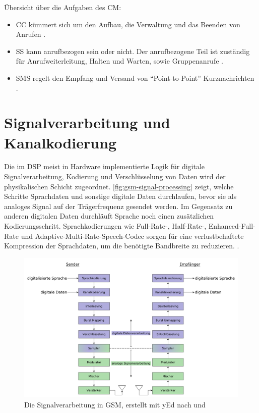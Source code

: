 Übersicht über die Aufgaben des \ac{CM}:
\begin{itemize}
\item \ac{CC} kümmert sich um den Aufbau, die Verwaltung und das Beenden von Anrufen .
\item \ac{SS} kann anrufbezogen sein oder nicht. Der anrufbezogene Teil ist zuständig für Anrufweiterleitung, Halten und Warten, sowie Gruppenanrufe .
\item \begin{sloppypar}\ac{SMS} regelt den Empfang und Versand von "`Point-to-Point"' Kurznachrichten .\end{sloppypar}
\end{itemize}

\section{Signalverarbeitung und Kanalkodierung} \label{hdl:encoding}
Die im \ac{DSP} meist in Hardware implementierte Logik für digitale Signalverarbeitung, Kodierung und Verschlüsselung von Daten wird der physikalischen Schicht zugeordnet. \autoref{fig:gsm-signal-processing} zeigt, welche Schritte Sprachdaten und sonstige digitale Daten durchlaufen, bevor sie als analoges Signal auf der Trägerfrequenz gesendet werden. Im Gegensatz zu anderen digitalen Daten durchläuft Sprache noch einen zusätzlichen Kodierungsschritt. Sprachkodierungen wie Full-Rate-, Half-Rate-, Enhanced-Full-Rate und Adaptive-Multi-Rate-Speech-Codec sorgen für eine verlustbehaftete Kompression der Sprachdaten, um die benötigte Bandbreite zu reduzieren. \citep[S. 55 ff.]{sauter:2011:grundkurs-mobile}.

\begin{figure}[H]
  \begin{center}
    \includegraphics[width=1.0\textwidth]{figures/gsm_signal_processing.pdf}
  \end{center}
  \caption[Die Signalverarbeitung in GSM]{Die Signalverarbeitung in \ac{GSM}, erstellt mit yEd nach  und \citep{zoudigital}} \label{fig:gsm-signal-processing} 
\end{figure}

